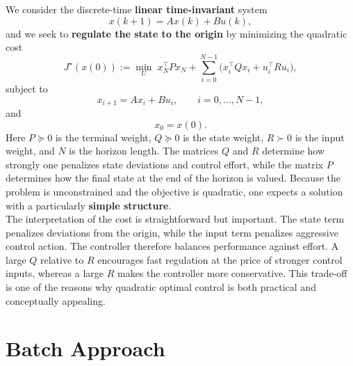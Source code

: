 We consider the discrete-time \textbf{linear time-invariant} system
\[
x(k+1)=Ax(k)+Bu(k),
\]
and we seek to \textbf{regulate the state to the origin} by minimizing the quadratic cost
\[
J^\star(x(0)) := \min_U \; x_N^\top P x_N + \sum_{i=0}^{N-1}\bigl(x_i^\top Q x_i + u_i^\top R u_i\bigr),
\]
subject to
\[
x_{i+1}=Ax_i+Bu_i, \qquad i=0,\dots,N-1,
\]
and
\[
x_0=x(0).
\]
Here $P\succeq 0$ is the terminal weight, $Q\succeq 0$ is the state weight, $R\succ 0$ is the input weight, and $N$ is the horizon length. The matrices $Q$ and $R$ determine how strongly one penalizes state deviations and control effort, while the matrix $P$ determines how the final state at the end of the horizon is valued. Because the problem is unconstrained and the objective is quadratic, one expects a solution with a particularly \textbf{simple structure}. \\
The interpretation of the cost is straightforward but important. The state term penalizes deviations from the origin, while the input term penalizes aggressive control action. The controller therefore balances performance against effort. A large $Q$ relative to $R$ encourages fast regulation at the price of stronger control inputs, whereas a large $R$ makes the controller more conservative. This trade-off is one of the reasons why quadratic optimal control is both practical and conceptually appealing.

\section{Batch Approach}

